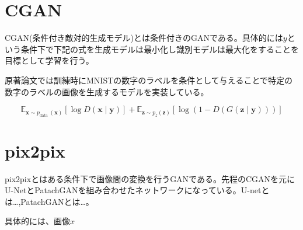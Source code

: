 \section{CGAN}

CGAN(条件付き敵対的生成モデル)とは条件付きのGANである。具体的には$y$という条件下で下記の式を生成モデルは最小化し識別モデルは最大化をすることを目標として学習を行う\cite{CGAN}。\par
原著論文では訓練時にMNISTの数字のラベルを条件として与えることで特定の数字のラベルの画像を生成するモデルを実装している。

$$\mathbb{E}_{\boldsymbol{x} \sim p_{\text {data }}(\boldsymbol{x})}[\log D(\boldsymbol{x} \mid \boldsymbol{y})]+\mathbb{E}_{\boldsymbol{z} \sim p_{z}(\boldsymbol{z})}[\log (1-D(G(\boldsymbol{z} \mid \boldsymbol{y})))]$$

\section{pix2pix}

pix2pixとはある条件下で画像間の変換を行うGANである。先程のCGANを元にU-NetとPatachGANを組み合わせたネットワークになっている。U-netとは…,PatachGANとは…。\par

具体的には、画像$x$




